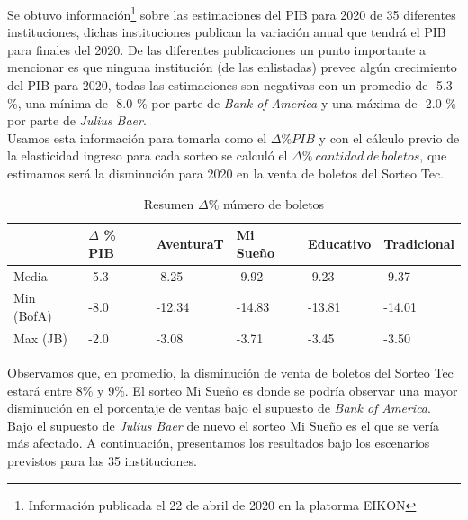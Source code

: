 \newpage



Se obtuvo información\footnote{Información publicada el 22 de abril de 2020 en la platorma EIKON} sobre las estimaciones del PIB para 2020 de 35 diferentes instituciones, dichas instituciones publican la variación anual que tendrá el PIB para finales del 2020. De las diferentes publicaciones un punto importante a mencionar es que ninguna institución (de las enlistadas) prevee algún crecimiento del PIB para 2020, todas las estimaciones son negativas con un promedio de -5.3 \%, una mínima de -8.0 \% por parte de \textit{Bank of America} y una máxima de -2.0 \% por parte de \textit{Julius Baer}. \\

Usamos esta información para tomarla como el $\Delta \% PIB$ y con el cálculo previo de la elasticidad ingreso para cada sorteo se calculó el $\Delta \%  \: cantidad \: de \: boletos$, que estimamos será la disminución para 2020 en la venta de boletos del Sorteo Tec. \\

\begin{table}[H]
\caption{Resumen $\Delta \%$ número de boletos}
\label{tab:my-resDx}
\begin{tabular}{l|l|llll}
           & $\Delta$ \% PIB   & AventuraT & Mi Sueño & Educativo & Tradicional \\ \hline
Media      & -5.3 & -8.25     & -9.92    & -9.23     & -9.37       \\
Min (BofA) & -8.0 & -12.34    & -14.83   & -13.81    & -14.01      \\
Max (JB)   & -2.0 & -3.08     & -3.71    & -3.45     & -3.50       \\ \hline
\end{tabular}
\end{table}

Observamos que, en promedio, la disminución de venta de boletos del Sorteo Tec estará entre 8\% y 9\%. El sorteo Mi Sueño es donde se podría observar una mayor disminución en el porcentaje de ventas bajo el supuesto de \textit{Bank of America}. Bajo el supuesto de \textit{Julius Baer} de nuevo el sorteo Mi Sueño es el que se vería más afectado. A continuación, presentamos los resultados bajo los escenarios previstos para las 35 instituciones.

